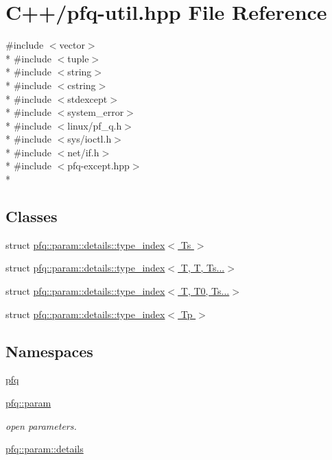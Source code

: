 \hypertarget{pfq-util_8hpp}{\section{C++/pfq-\/util.hpp File Reference}
\label{pfq-util_8hpp}
}
{\ttfamily \#include $<$vector$>$}\\*
{\ttfamily \#include $<$tuple$>$}\\*
{\ttfamily \#include $<$string$>$}\\*
{\ttfamily \#include $<$cstring$>$}\\*
{\ttfamily \#include $<$stdexcept$>$}\\*
{\ttfamily \#include $<$system\+\_\+error$>$}\\*
{\ttfamily \#include $<$linux/pf\+\_\+q.\+h$>$}\\*
{\ttfamily \#include $<$sys/ioctl.\+h$>$}\\*
{\ttfamily \#include $<$net/if.\+h$>$}\\*
{\ttfamily \#include $<$pfq-\/except.\+hpp$>$}\\*
\subsection*{Classes}
\begin{DoxyCompactItemize}
\item 
struct \hyperlink{structpfq_1_1param_1_1details_1_1type__index}{pfq\+::param\+::details\+::type\+\_\+index$<$ Ts $>$}
\item 
struct \hyperlink{structpfq_1_1param_1_1details_1_1type__index_3_01T_00_01T_00_01Ts_8_8_8_4}{pfq\+::param\+::details\+::type\+\_\+index$<$ T, T, Ts...$>$}
\item 
struct \hyperlink{structpfq_1_1param_1_1details_1_1type__index_3_01T_00_01T0_00_01Ts_8_8_8_4}{pfq\+::param\+::details\+::type\+\_\+index$<$ T, T0, Ts...$>$}
\item 
struct \hyperlink{structpfq_1_1param_1_1details_1_1type__index_3_01Tp_01_4}{pfq\+::param\+::details\+::type\+\_\+index$<$ Tp $>$}
\end{DoxyCompactItemize}
\subsection*{Namespaces}
\begin{DoxyCompactItemize}
\item 
 \hyperlink{namespacepfq}{pfq}
\item 
 \hyperlink{namespacepfq_1_1param}{pfq\+::param}
\begin{DoxyCompactList}\small\item\em open parameters. \end{DoxyCompactList}\item 
 \hyperlink{namespacepfq_1_1param_1_1details}{pfq\+::param\+::details}
\end{DoxyCompactItemize}
